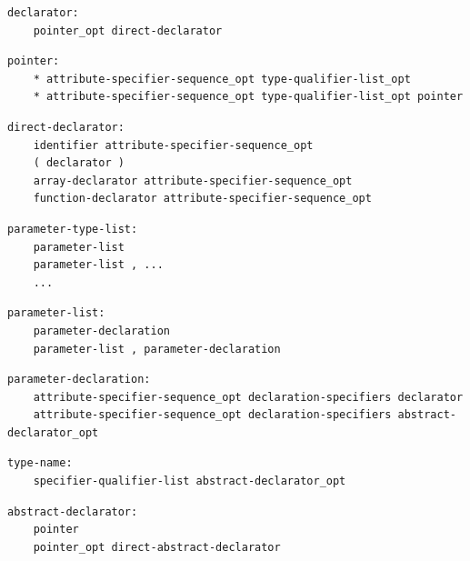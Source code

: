 \noindent\textbf{\texttt{}}\par
\begin{lstlisting}
declarator:
    pointer_opt direct-declarator
\end{lstlisting}

\noindent\textbf{\texttt{}}\par
\begin{lstlisting}
pointer:
    * attribute-specifier-sequence_opt type-qualifier-list_opt
    * attribute-specifier-sequence_opt type-qualifier-list_opt pointer
\end{lstlisting}

\noindent\textbf{\texttt{}}\par
\begin{lstlisting}
direct-declarator:
    identifier attribute-specifier-sequence_opt
    ( declarator )
    array-declarator attribute-specifier-sequence_opt
    function-declarator attribute-specifier-sequence_opt
\end{lstlisting}

\noindent\textbf{\texttt{}}\par
\begin{lstlisting}
parameter-type-list:
    parameter-list
    parameter-list , ...
    ...
\end{lstlisting}

\noindent\textbf{\texttt{}}\par
\begin{lstlisting}
parameter-list:
    parameter-declaration
    parameter-list , parameter-declaration
\end{lstlisting}

\noindent\textbf{\texttt{}}\par
\begin{lstlisting}
parameter-declaration:
    attribute-specifier-sequence_opt declaration-specifiers declarator
    attribute-specifier-sequence_opt declaration-specifiers abstract-declarator_opt
\end{lstlisting}

\noindent\textbf{\texttt{}}\par
\begin{lstlisting}
type-name:
    specifier-qualifier-list abstract-declarator_opt
\end{lstlisting}

\noindent\textbf{\texttt{}}\par
\begin{lstlisting}
abstract-declarator:
    pointer
    pointer_opt direct-abstract-declarator
\end{lstlisting}

